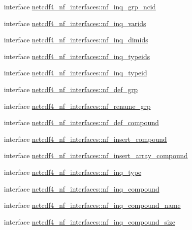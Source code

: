 \begin{DoxyCompactItemize}
interface \hyperlink{interfacenetcdf4__nf__interfaces_1_1nf__inq__grp__ncid}{netcdf4\+\_\+nf\+\_\+interfaces\+::nf\+\_\+inq\+\_\+grp\+\_\+ncid}
\item 
interface \hyperlink{interfacenetcdf4__nf__interfaces_1_1nf__inq__varids}{netcdf4\+\_\+nf\+\_\+interfaces\+::nf\+\_\+inq\+\_\+varids}
\item 
interface \hyperlink{interfacenetcdf4__nf__interfaces_1_1nf__inq__dimids}{netcdf4\+\_\+nf\+\_\+interfaces\+::nf\+\_\+inq\+\_\+dimids}
\item 
interface \hyperlink{interfacenetcdf4__nf__interfaces_1_1nf__inq__typeids}{netcdf4\+\_\+nf\+\_\+interfaces\+::nf\+\_\+inq\+\_\+typeids}
\item 
interface \hyperlink{interfacenetcdf4__nf__interfaces_1_1nf__inq__typeid}{netcdf4\+\_\+nf\+\_\+interfaces\+::nf\+\_\+inq\+\_\+typeid}
\item 
interface \hyperlink{interfacenetcdf4__nf__interfaces_1_1nf__def__grp}{netcdf4\+\_\+nf\+\_\+interfaces\+::nf\+\_\+def\+\_\+grp}
\item 
interface \hyperlink{interfacenetcdf4__nf__interfaces_1_1nf__rename__grp}{netcdf4\+\_\+nf\+\_\+interfaces\+::nf\+\_\+rename\+\_\+grp}
\item 
interface \hyperlink{interfacenetcdf4__nf__interfaces_1_1nf__def__compound}{netcdf4\+\_\+nf\+\_\+interfaces\+::nf\+\_\+def\+\_\+compound}
\item 
interface \hyperlink{interfacenetcdf4__nf__interfaces_1_1nf__insert__compound}{netcdf4\+\_\+nf\+\_\+interfaces\+::nf\+\_\+insert\+\_\+compound}
\item 
interface \hyperlink{interfacenetcdf4__nf__interfaces_1_1nf__insert__array__compound}{netcdf4\+\_\+nf\+\_\+interfaces\+::nf\+\_\+insert\+\_\+array\+\_\+compound}
\item 
interface \hyperlink{interfacenetcdf4__nf__interfaces_1_1nf__inq__type}{netcdf4\+\_\+nf\+\_\+interfaces\+::nf\+\_\+inq\+\_\+type}
\item 
interface \hyperlink{interfacenetcdf4__nf__interfaces_1_1nf__inq__compound}{netcdf4\+\_\+nf\+\_\+interfaces\+::nf\+\_\+inq\+\_\+compound}
\item 
interface \hyperlink{interfacenetcdf4__nf__interfaces_1_1nf__inq__compound__name}{netcdf4\+\_\+nf\+\_\+interfaces\+::nf\+\_\+inq\+\_\+compound\+\_\+name}
\item 
interface \hyperlink{interfacenetcdf4__nf__interfaces_1_1nf__inq__compound__size}{netcdf4\+\_\+nf\+\_\+interfaces\+::nf\+\_\+inq\+\_\+compound\+\_\+size}
\item 

\end{DoxyCompactItemize}
